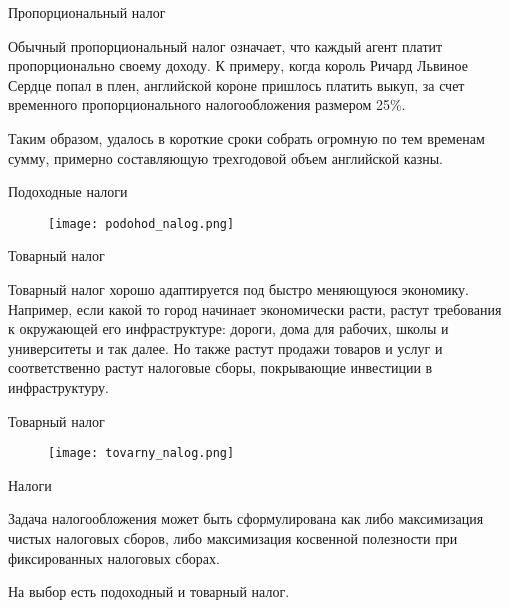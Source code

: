 \documentclass{beamer}
\begin{document}
\begin{frame}{Пропорциональный налог}

Обычный пропорциональный налог означает, что каждый агент платит пропорционально своему доходу. К примеру, когда король Ричард Львиное Сердце попал в плен, английской короне пришлось платить выкуп, за счет временного пропорционального налогообложения размером 25\%. 

Таким образом, удалось в короткие сроки собрать огромную по тем временам сумму, примерно составляющую трехгодовой объем английской казны.

\end{frame}

\begin{frame}{Подоходные налоги}

\begin{figure}[hbt]
\centering
\texttt{[image: podohod\_nalog.png]}
\end{figure}

\end{frame}

\begin{frame}{Товарный налог}

Товарный налог хорошо адаптируется под быстро меняющуюся экономику. Например, если какой то город начинает экономически расти, растут требования к окружающей его инфраструктуре: дороги, дома для рабочих, школы и университеты и так далее. Но также растут продажи товаров и услуг и соответственно растут налоговые сборы, покрывающие инвестиции в инфраструктуру.

\end{frame}

\begin{frame}{Товарный налог}

\begin{figure}[hbt]
\centering
\texttt{[image: tovarny\_nalog.png]}
\end{figure}

\end{frame}

\begin{frame}{Налоги}

Задача налогообложения может быть сформулирована как либо максимизация чистых налоговых сборов, либо максимизация косвенной полезности при фиксированных налоговых сборах. 

На выбор есть подоходный и товарный налог.

\end{frame}
\end{document}
